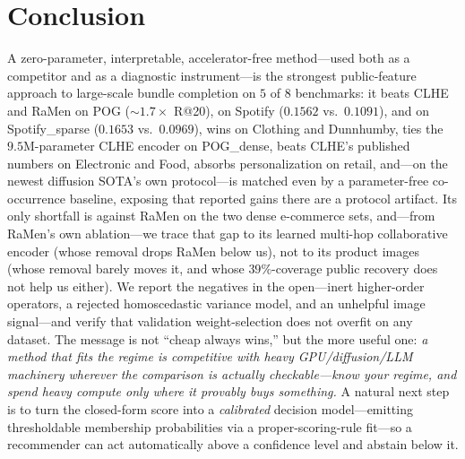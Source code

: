 \section{Conclusion}
\label{sec:conc}
A zero-parameter, interpretable, accelerator-free method---used both as a competitor and as a diagnostic
instrument---is the strongest public-feature approach to large-scale bundle completion on $5$ of $8$ benchmarks: it
beats CLHE and RaMen on POG (${\sim}1.7\times$ R@20), on Spotify ($0.1562$ vs.\ $0.1091$), and on Spotify\_sparse
($0.1653$ vs.\ $0.0969$), wins on Clothing and Dunnhumby, ties the $9.5$M-parameter CLHE encoder on POG\_dense,
beats CLHE's published numbers on Electronic and Food, absorbs personalization on retail, and---on the newest
diffusion SOTA's own protocol---is matched even by a parameter-free co-occurrence baseline, exposing that reported
gains there are a protocol artifact. Its only shortfall is against RaMen on the two dense e-commerce sets, and---from
RaMen's own ablation---we trace that gap to its learned multi-hop collaborative encoder (whose removal drops RaMen
below us), not to its product images (whose removal barely moves it, and whose $39\%$-coverage public recovery does
not help us either). We report the negatives in the open---inert higher-order operators, a rejected homoscedastic
variance model, and an unhelpful image signal---and verify that validation
weight-selection does not
overfit on any dataset. The message is not ``cheap always wins,'' but the more useful one: \emph{a method that fits
the regime is competitive with heavy GPU/diffusion/LLM machinery wherever the comparison is actually checkable---know
your regime, and spend heavy compute only where it provably buys something.} A natural next step is to turn the
closed-form score into a \emph{calibrated} decision model---emitting thresholdable membership probabilities via a
proper-scoring-rule fit---so a recommender can act automatically above a confidence level and abstain below it.
